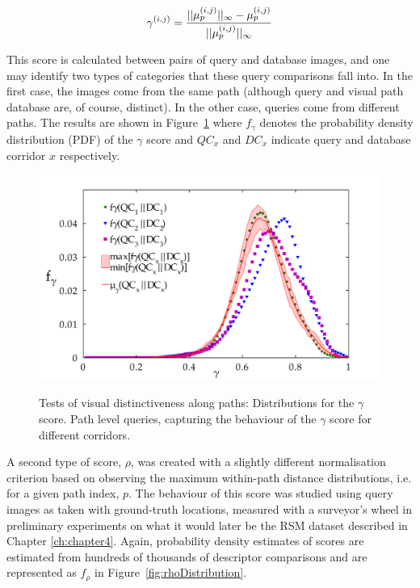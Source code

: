 \begin{equation}
\centering
\gamma^{(i,j)} = \frac{||\mu^{(i,j)}_p||_{\infty}-\mu^{(i,j)}_p}{||\mu^{(i,j)}_p||_{\infty}}
\end{equation}

This score is calculated between pairs of query and database images, and one may identify two types of categories that these query comparisons fall into.  In the first case, the images come from the same path (although query and visual path database are, of course, distinct).  In the other case, queries come from different paths.  The results are shown in Figure~\ref{fig:gammaDistribution} where $f_\gamma$ denotes the probability density distribution (PDF) of the $\gamma$ score and $QC_x$ and $DC_x$ indicate query and database corridor $x$ respectively.   

\begin{figure}[ht]
\centering
{\includegraphics[width=\linewidth]{./gfx/Chapter02/path_pdf_analysisWithShadedBetweensALLDB.pdf}}
\caption{Tests of visual distinctiveness along paths: Distributions for the $\gamma$ score. Path level queries, capturing the behaviour of the $\gamma$ score for different corridors.}
\label{fig:gammaDistribution}
\end{figure}
 



A second type of score, $\rho$, was created with a slightly different normalisation criterion based on observing the maximum within-path distance distributions, i.e. for a given path index, $p$.  The behaviour of this score was studied using query images as taken with ground-truth locations, measured with a surveyor's wheel in preliminary experiments on what it would later be the RSM dataset described in Chapter \ref{ch:chapter4}. Again, probability density estimates of scores are estimated from hundreds of thousands of descriptor comparisons and are represented as $f_\rho$ in Figure~\ref{fig:rhoDistribution}.


